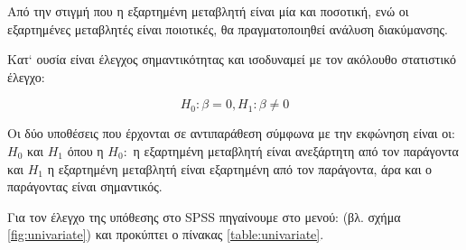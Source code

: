 \documentclass{assignment}
\begin{document}
\begin{Assignment}[Μέρος Δ]
Από την στιγμή που η εξαρτημένη μεταβλητή είναι μία και ποσοτική, ενώ οι εξαρτημένες μεταβλητές είναι ποιοτικές, θα πραγματοποιηθεί ανάλυση διακύμανσης.

Κατ` ουσία είναι έλεγχος σημαντικότητας και ισοδυναμεί με τον ακόλουθο στατιστικό έλεγχο:

\begin{equation}
H_0:\beta = 0, H_1: \beta \neq 0
\end{equation}

Οι δύο υποθέσεις που έρχονται σε αντιπαράθεση σύμφωνα με την εκφώνηση είναι οι: $H_0$ και $H_1$ όπου η $H_0:$ η εξαρτημένη μεταβλητή είναι ανεξάρτητη από τον παράγοντα και $H_1$ η εξαρτημένη μεταβλητή είναι εξαρτημένη από τον παράγοντα, άρα και ο παράγοντας είναι σημαντικός.

Για τον έλεγχο της υπόθεσης στο SPSS πηγαίνουμε στο μενού:  (βλ. σχήμα \ref{fig:univariate}) και προκύπτει ο πίνακας \ref{table:univariate}. 


\end{Assignment}
\end{document}
